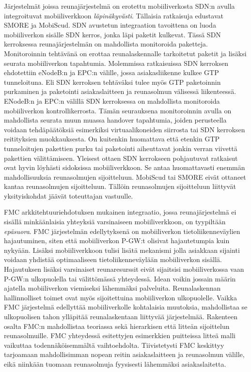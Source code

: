 Järjestelmät joissa reunajärjestelmä on erotettu mobiiliverkosta SDN:n avulla integroituvat mobiiliverkkoon \textit{läpinäkyvästi}. 
Tällaisia ratkaisuja edustavat SMORE ja MobiScud.
SDN avustetun integraation tavoittena on luoda mobiiliverkon sisälle SDN kerros, jonka läpi paketit kulkevat.
Tässä SDN kerroksessa reunajärjestelmän on mahdollista monitoroida paketteja. Monitoroinnin tehtävänä on erottaa reunalaskennalle tarkoitetut paketit ja lisäksi seurata mobiiliverkon tapahtumia. 
Molemmissa ratkaisuissa SDN kerroksen ehdotettiin eNodeB:n ja EPC:n välille, jossa asiakasliikenne kulkee GTP tunneloituna.
Eli SDN kerroksen tehtäväksi tulee myös GTP paketoinnin purkaminen ja paketointi asiakaslaitteen ja reunasolmun välisessä liikenteessä.
ENodeB:n ja EPC:n välillä SDN kerroksessa on mahdollista monitoroida mobiiliverkon kontrollikerrosta. Tämän seurauksena  monitoroinnin avulla on mahdollista seurata muun muassa handover tapahtumia, joiden perusteella voidaan tehdäpäätöksiä esimerkiksi  virtuaalikoneiden siirrosta tai SDN kerroksen reitityksien muokkauksesta.
On kuitenkin huomattava että etenkin GTP tunneloitujen pakettien purku tai paketointi aiheuttavat jonkin verran viivettä pakettien välittämiseen.
Yleisest ottaen SDN kerrokseen pohjautuvat ratkaisut ovat hyvin löyhästi sidoksissa mobiiliverkkoon. Se antaa huomattavasti enemmän mahdollisuuksia reunasolmujen sijoitteluun. 
MobiScud tai SMORE eivät ottaneet kantaa reunasolmujen sijoitteluun. Tällöin reunasolmujen sijoitteluun liittyvät yksityiskohdat jäävät toteuttajan vastuulle.

FMC arkkitehtuuriehdotuksen mukainen integraatio, jossa reunajärjestelmä ei sisällä minkäänlaisia yhteyksiä varsinaiseen mobiiliverkkoon, on tyypiltään \textit{epäsuora}.
FMC järjestelmän edellytyksenä on mobiiliverkon tietoliikenneväylien hajautuminen, siten että mobiiliverkon P-GW:t olisivat hajautetumpia kuin nykyään. 
Lisäksi mobiiliverkkoon tulisi lisätä mekanismi jolla asiakkaan sijainti voidaan yhdistää optimaaliseen tietoliikenneväylään mobiiliverkon sisällä.
Hajautuksen lisäksi varsinaiset reunaresurssit eivät sijaitsisi mobiiliverkossa vaan P-GW:n ulkopuolella tai välittömässä yhteydessä.
Idean voikin jossain määrin ajatella mobiiliverkon viemiseksi lähemmäksi palveluita.
Reunalaskennan hallinnolliset toimet ovat myös sijoitettuina mobiiliverkon ulkopuolelle.
Vaikka FMC järjestelmä edellyttää mobiiliverkolle kohtalaisia muutoksia, mahdollistaa se ulkopuolisen tahon ylläpitää reunalaskentaan liittyvää järjestelmää.
Rakenteen osalta FMC:n mahdollistaa teoriassa sekä hierarkisen että litteän sijoittelun reunasolmuille.
FMC yhteydessä esitettyjen esimerkkien puitteissa litteä malli vaikuttaa todennäköisemmältä vaihtoehdolta. 
Tiivistetysti FMC keskittyy tarjoamaan mahdollisimman nopean reitin asiakaslaitteen ja reunasolmun välille, eikä niinkään tuomaan reunasolmuja fyysisesti lähemmäksi asiakaslaitetta.

